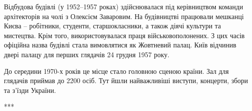Відбудова будівлі (у 1952–1957 роках) здійснювалася під керівництвом команди
архітекторів на чолі з  Олексієм Заваровим. На будівництві працювали мешканці
Києва – робітники, студенти, старшокласники, а також діячі культури та
мистецтва. Крім того, використовувалася праця військовополонених. З цих часів
офіційна назва будівлі стала вимовлятися як Жовтневий палац. Київ відчинив
двері палацу для перших глядачів 24 грудня 1957 року.

До середини 1970-х років це місце стало головною сценою країни. Зал для
глядачів приймав до 2200 осіб. Тут йшли найважливіші виступи, концерти, збори
та з'їзди України.

***

